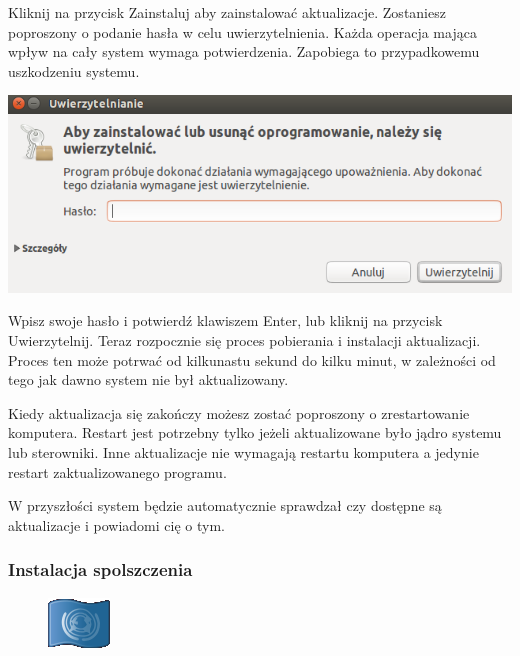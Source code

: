 Kliknij na przycisk \textcolor{ubuntu_orange}{Zainstaluj} aby zainstalować aktualizacje. Zostaniesz poproszony o podanie hasła w celu uwierzytelnienia. Każda operacja mająca wpływ na cały system wymaga potwierdzenia. Zapobiega to przypadkowemu uszkodzeniu systemu.
\begin{center}
        \includegraphics{images/unity_uwierzytelnienie.png}
\end{center}

Wpisz swoje hasło i potwierdź klawiszem Enter, lub kliknij na przycisk \textcolor{ubuntu_orange}{Uwierzytelnij}. Teraz rozpocznie się proces pobierania i instalacji aktualizacji. Proces ten może potrwać od kilkunastu sekund do kilku minut, w zależności od tego jak dawno system nie był aktualizowany.

Kiedy aktualizacja się zakończy możesz zostać poproszony o zrestartowanie komputera. Restart jest potrzebny tylko jeżeli aktualizowane było jądro systemu lub sterowniki. Inne aktualizacje nie wymagają restartu komputera a jedynie restart zaktualizowanego programu.

W przyszłości system będzie automatycznie sprawdzał czy dostępne są aktualizacje i powiadomi cię o tym.

\subsubsection{Instalacja spolszczenia}
\begin{figure}
        \includegraphics[width=\linewidth]{images/pierwsze_uruchomienie_lang1.png}
\end{figure}

